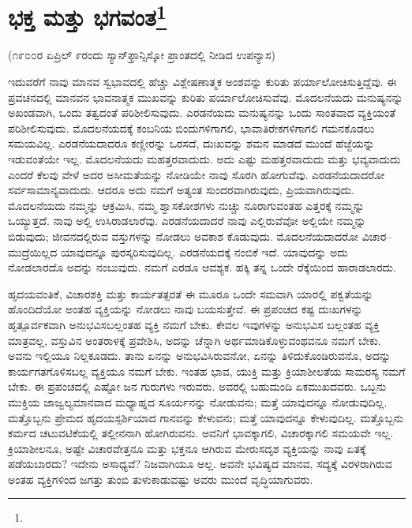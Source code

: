 
\chapter[ಭಕ್ತ ಮತ್ತು ಭಗವಂತ]{ಭಕ್ತ ಮತ್ತು ಭಗವಂತ\protect\footnote{}}

\begin{center}
(೧೯೦೦ರ ಏಪ್ರಿಲ್ ೯ರಂದು ಸ್ಯಾನ್‌ಫ್ರಾನ್ಸಿಸ್ಕೋ ಪ್ರಾಂತದಲ್ಲಿ ನೀಡಿದ ಉಪನ್ಯಾಸ)
\end{center}

ಇದುವರೆಗೆ ನಾವು ಮಾನವ ಸ್ವಭಾವದಲ್ಲಿ ಹೆಚ್ಚು ವಿಶ್ಲೇಷಣಾತ್ಮಕ ಅಂಶವನ್ನು ಕುರಿತು ಪರ್ಯಾಲೋಚಿಸುತ್ತಿದ್ದೆವು. ಈ ಪ್ರವಚನದಲ್ಲಿ ಮಾನವನ ಭಾವನಾತ್ಮಕ ಮುಖವನ್ನು ಕುರಿತು ಪರ್ಯಾಲೋಚಿಸುವೆವು. ಮೊದಲನೆಯದು ಮನುಷ್ಯನನ್ನು ಅಖಂಡವಾಗಿ, ಒಂದು ತತ್ವದಂತೆ ಪರಿಶೀಲಿಸುವುದು. ಎರಡನೆಯದು ಮನುಷ್ಯನನ್ನು ಒಂದು ಸಾಂತವಾದ ವ್ಯಕ್ತಿಯಂತೆ ಪರಿಶೀಲಿಸುವುದು. ಮೊದಲನೆಯದಕ್ಕೆ ಕಂಬನಿಯ ಬಿಂದುಗಳಿಗಾಗಲಿ, ಭಾವಾತಿರೇಕಗಳಿಗಾಗಲಿ ಗಮನಕೊಡಲು ಸಮಯವಿಲ್ಲ. ಎರಡನೆಯದಾದರೂ ಕಣ್ಣೀರನ್ನು ಒರಸದೆ, ದುಃಖವನ್ನು ಶಮನ ಮಾಡದೆ ಮುಂದೆ ಹೆಜ್ಜೆಯನ್ನು ಇಡುವಂತೆಯೇ ಇಲ್ಲ. ಮೊದಲನೆಯದು ಮಹತ್ತರವಾದುದು. ಅದು ಎಷ್ಟು ಮಹತ್ತರವಾದುದು ಮತ್ತು ಭವ್ಯವಾದುದು ಎಂದರೆ ಕೆಲವು ವೇಳೆ ಅದರ ಅಸೀಮತೆಯನ್ನು ನೋಡಿಯೇ ನಾವು ಸೊರಗಿ ಹೋಗುವೆವು. ಎರಡನೆಯದಾದರೋ ಸರ್ವಸಾಮಾನ್ಯವಾದುದು. ಆದರೂ ಅದು ನಮಗೆ ಅತ್ಯಂತ ಸುಂದರವಾಗಿರುವುದು, ಪ್ರಿಯವಾಗಿರುವುದು. ಮೊದಲನೆಯದು ನಮ್ಮನ್ನು ಆಕ್ರಮಿಸಿ, ನಮ್ಮ ಶ್ವಾಸಕೋಶಗಳು ನುಚ್ಚು ನೂರಾಗುವಂತಹ ಎತ್ತರಕ್ಕೆ ನಮ್ಮನ್ನು ಒಯ್ಯುತ್ತದೆ. ನಾವು ಅಲ್ಲಿ ಉಸಿರಾಡಲಾರೆವು. ಎರಡನೆಯದಾದರೆ ನಾವು ಎಲ್ಲಿರುವೆವೋ ಅಲ್ಲಿಯೇ ನಮ್ಮನ್ನು ಬಿಡುವುದು; ಜೀವನದಲ್ಲಿರುವ ವಸ್ತುಗಳನ್ನು ನೋಡಲು ಅವಕಾಶ ಕೊಡುವುದು. ಮೊದಲನೆಯದಾದರೋ ವಿಚಾರ–ಮುದ್ರೆಯಿಲ್ಲದ ಯಾವುದನ್ನೂ ಪುರಸ್ಕರಿಸುವುದಿಲ್ಲ. ಎರಡನೆಯದಕ್ಕೆ ನಂಬಿಕೆ ಇದೆ. ಯಾವುದನ್ನು ಅದು ನೋಡಲಾರದೊ ಅದನ್ನು ನಂಬುವುದು. ನಮಗೆ ಎರಡೂ ಆವಶ್ಯಕ. ಹಕ್ಕಿ ತನ್ನ ಒಂದೇ ರೆಕ್ಕೆಯಿಂದ ಹಾರಾಡಲಾರದು.

ಹೃದಯವಂತಿಕೆ, ವಿಚಾರಶಕ್ತಿ ಮತ್ತು ಕಾರ್ಯತತ್ಪರತೆ ಈ ಮೂರೂ ಒಂದೇ ಸಮವಾಗಿ ಯಾರಲ್ಲಿ ಪಕ್ವತೆಯನ್ನು ಹೊಂದಿದೆಯೋ ಅಂತಹ ವ್ಯಕ್ತಿಯನ್ನು ನೋಡಲು ನಾವು ಬಯಸುತ್ತೇವೆ. ಈ ಪ್ರಪಂಚದ ಕಷ್ಟ ದುಃಖಗಳನ್ನು ಹೃತ್ಪೂರ್ವಕವಾಗಿ ಅನುಭವಿಸಬಲ್ಲಂತಹ ವ್ಯಕ್ತಿ ನಮಗೆ ಬೇಕು. ಕೇವಲ ಇವುಗಳನ್ನು ಅನುಭವಿಸ ಬಲ್ಲಂತಹ ವ್ಯಕ್ತಿ ಮಾತ್ರವಲ್ಲ, ವಸ್ತುವಿನ ಅಂತರಾಳಕ್ಕೆ ಪ್ರವೇಶಿಸಿ, ಅದನ್ನು ಚೆನ್ನಾಗಿ ಅರ್ಥಮಾಡಿಕೊಳ್ಳುವಂಥವನೂ ನಮಗೆ ಬೇಕು. ಅವನು ಇಲ್ಲಿಯೂ ನಿಲ್ಲಕೂಡದು. ತಾನು ಏನನ್ನು ಅನುಭವಿಸಿರುವನೋ, ಏನನ್ನು ತಿಳಿದುಕೊಂಡಿರುವನೊ, ಅದನ್ನು ಕಾರ್ಯಗತಗೊಳಿಸಬಲ್ಲ ವ್ಯಕ್ತಿಯೂ ನಮಗೆ ಬೇಕು. ಇಂತಹ ಭಾವ, ಯುಕ್ತಿ ಮತ್ತು ಕ್ರಿಯಾಶೀಲತೆಯ ಸಾಮರಸ್ಯ ನಮಗೆ ಬೇಕು. ಈ ಪ್ರಪಂಚದಲ್ಲಿ ಎಷ್ಟೋ ಜನ ಗುರುಗಳು ಇರುವರು. ಅವರಲ್ಲಿ ಬಹುಮಂದಿ ಏಕಮುಖದವರು. ಒಬ್ಬನು ಮುಕ್ತಿಯ ಜಾಜ್ವಲ್ಯಮಾನವಾದ ಮಧ್ಯಾಹ್ನದ ಸೂರ್ಯನನ್ನು ನೋಡುವನು; ಮತ್ತೆ ಯಾವುದನ್ನೂ ನೋಡುವುದಿಲ್ಲ. ಮತ್ತೊಬ್ಬನು ಪ್ರೇಮದ ಹೃದಯಸ್ಪರ್ಶಿಯಾದ ಗಾನವನ್ನು ಕೇಳುವನು; ಮತ್ತೆ ಯಾವುದನ್ನೂ ಕೇಳುವುದಿಲ್ಲ. ಮತ್ತೊಬ್ಬನು ಕರ್ಮದ ಚಟುವಟಿಕೆಯಲ್ಲಿ ತಲ್ಲೀನನಾಗಿ ಹೋಗಿರುವನು. ಅವನಿಗೆ ಭಾವಕ್ಕಾಗಲಿ, ವಿಚಾರಕ್ಕಾಗಲಿ ಸಮಯವೇ ಇಲ್ಲ. ಕ್ರಿಯಾಶೀಲನೂ, ಅಷ್ಟೇ ವಿಚಾರವೇತ್ತನೂ ಮತ್ತು ಭಕ್ತನೂ ಆಗಿರುವ ಮೇರುಸದೃಶ ವ್ಯಕ್ತಿಯನ್ನು ನಾವು ಏತಕ್ಕೆ ಪಡೆಯಬಾರದು? ಇದೇನು ಅಸಾಧ್ಯವೆ? ನಿಜವಾಗಿಯೂ ಅಲ್ಲ. ಅವನೇ ಭವಿಷ್ಯದ ಮಾನವ, ಸದ್ಯಕ್ಕೆ ವಿರಳರಾಗಿರುವ ಅಂತಹ ವ್ಯಕ್ತಿಗಳಿಂದ ಜಗತ್ತು ತುಂಬಿ ತುಳುಕಾಡುವಷ್ಟು ಅವರು ಮುಂದೆ ವೃದ್ಧಿಯಾಗುವರು.

